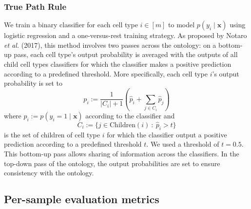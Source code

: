 \subsubsection*{True Path Rule}

We train a binary classifier for each cell type $i \in [m]$ to model $p(y_i \mid \boldsymbol{x})$ using logistic regression and a one-versus-rest training strategy.  As proposed by Notaro \textit{et al.} (2017), this method involves two passes across the ontology: on a bottom-up pass, each cell type's output probability is averaged with the outputs of all child cell types classifiers for which the classifier makes a positive prediction according to a predefined threshold.  More specifically, each cell type $i$'s output probability is set to
$$p_i := \frac{1}{|C_i|+1}\left(\hat{p}_i + \sum_{j \in C_i} \hat{p}_j\right)$$
where $\hat{p}_i := p(y_i=1 \mid \boldsymbol{x})$ according to the classifier and 
$$C_i := \{j \in \text{Children}(i) \ : \ \hat{p}_i > t \}$$ 
is the set of children of cell type $i$ for which the classifier output a positive prediction according to a predefined threshold $t$. We used a threshold of $t = 0.5$.  This bottom-up pass allows sharing of information across the classifiers. In the top-down pass of the ontology, the output probabilities are set to ensure consistency with the ontology.

\subsection*{Per-sample evaluation metrics}

